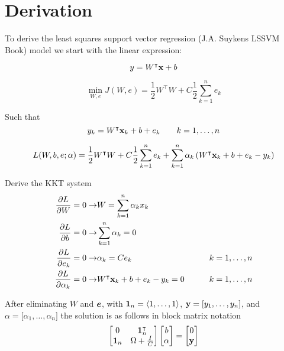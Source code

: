 \documentclass[a4paper,12pt]{scrreprt}
\begin{document}
\chapter{Derivation}
To derive the least squares support vector regression (J.A. Suykens LSSVM Book) model we start with the linear expression:

\begin{equation}
        y=W^{\intercal}\vb{x}+b
\end{equation}

\begin{equation}
        \min_{W,e} J(W,e) = \frac{1}{2}W^{\intercal}W + C\frac{1}{2}\sum_{k=1}^{n}e_{k}
\end{equation}

Such that
\begin{equation}
        y_{k}=W^{\intercal}\vb{x}_{k}+b+e_{k} \qquad k=1,\dots,n
\end{equation}

\begin{equation}
        L(W,b,e;\vb{\alpha}) = \frac{1}{2}W^{\intercal}W + C\frac{1}{2}\sum_{k=1}^{n}e_{k} + \sum_{k=1}^{n}\alpha_{k} \left(W^{\intercal}\vb{x}_{k}+b+e_{k} - y_{k} \right)
\end{equation}

Derive the KKT system
\begin{align}
        \pdv{L}{W} = 0 \rightarrow          & W = \sum_{k=1}^{n}\alpha_{k}x_{k}                                \\
        \pdv{L}{b} = 0 \rightarrow          & \sum_{k=1}^{n}\alpha_{k} = 0                                     \\
        \pdv{L}{e_{k}} = 0 \rightarrow      & \alpha_{k} = C e_{k}                        & \qquad k=1,\dots,n \\
        \pdv{L}{\alpha_{k}} = 0 \rightarrow & W^{\intercal}\vb{x}_{k}+b+e_{k} - y_{k} = 0 & \qquad k=1,\dots,n \\
\end{align}

After eliminating $W$ and $\vb*{e}$, with $\vb{1}_{n} = \langle 1,\dots,1\rangle$, $\vb{y} = \lbrack y_1, \dots, y_n \rbrack $, and ${\alpha} = \lbrack \alpha_1, \dots, \alpha_n \rbrack $ the solution is as follows in block matrix notation
\begin{equation} \label{eq:lssvrSolution}
        \begin{bmatrix}
                0          & \vb{1}_{n}^{\intercal} \\
                \vb{1}_{n} & \Omega + \frac{I}{C}
        \end{bmatrix}
        \begin{bmatrix}
                b           \\
                \vb{\alpha} \\
        \end{bmatrix}
        =
        \begin{bmatrix}
                0      \\
                \vb{y} \\
        \end{bmatrix}
\end{equation}
\end{document}
